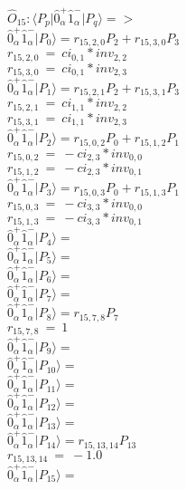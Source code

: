 \documentclass[14pt]{article}
\begin{document}
    $\hat{O}_{15}:  \langle{P_p}\vert \hat{0}_{\alpha}^{+}\hat{1}_{\alpha}^{-} \vert{P_q}\rangle => $ \\ 
    $ \hat{0}_{\alpha}^{+}\hat{1}_{\alpha}^{-} \vert{P_{0}}\rangle = {r}_{15,2,0}P_{2}+{r}_{15,3,0}P_{3} $ \\ 
    ${r}_{15,2,0}\ =\ {ci}_{0,1}*{inv}_{2,2} $ \\ 
    ${r}_{15,3,0}\ =\ {ci}_{0,1}*{inv}_{2,3} $ \\ 
    $ \hat{0}_{\alpha}^{+}\hat{1}_{\alpha}^{-} \vert{P_{1}}\rangle = {r}_{15,2,1}P_{2}+{r}_{15,3,1}P_{3} $ \\ 
    ${r}_{15,2,1}\ =\ {ci}_{1,1}*{inv}_{2,2} $ \\ 
    ${r}_{15,3,1}\ =\ {ci}_{1,1}*{inv}_{2,3} $ \\ 
    $ \hat{0}_{\alpha}^{+}\hat{1}_{\alpha}^{-} \vert{P_{2}}\rangle = {r}_{15,0,2}P_{0}+{r}_{15,1,2}P_{1} $ \\ 
    ${r}_{15,0,2}\ =\ -{ci}_{2,3}*{inv}_{0,0} $ \\ 
    ${r}_{15,1,2}\ =\ -{ci}_{2,3}*{inv}_{0,1} $ \\ 
    $ \hat{0}_{\alpha}^{+}\hat{1}_{\alpha}^{-} \vert{P_{3}}\rangle = {r}_{15,0,3}P_{0}+{r}_{15,1,3}P_{1} $ \\ 
    ${r}_{15,0,3}\ =\ -{ci}_{3,3}*{inv}_{0,0} $ \\ 
    ${r}_{15,1,3}\ =\ -{ci}_{3,3}*{inv}_{0,1} $ \\ 
    $ \hat{0}_{\alpha}^{+}\hat{1}_{\alpha}^{-} \vert{P_{4}}\rangle =  $ \\ 
    $ \hat{0}_{\alpha}^{+}\hat{1}_{\alpha}^{-} \vert{P_{5}}\rangle =  $ \\ 
    $ \hat{0}_{\alpha}^{+}\hat{1}_{\alpha}^{-} \vert{P_{6}}\rangle =  $ \\ 
    $ \hat{0}_{\alpha}^{+}\hat{1}_{\alpha}^{-} \vert{P_{7}}\rangle =  $ \\ 
    $ \hat{0}_{\alpha}^{+}\hat{1}_{\alpha}^{-} \vert{P_{8}}\rangle = {r}_{15,7,8}P_{7} $ \\ 
    ${r}_{15,7,8}\ =\ 1 $ \\ 
    $ \hat{0}_{\alpha}^{+}\hat{1}_{\alpha}^{-} \vert{P_{9}}\rangle =  $ \\ 
    $ \hat{0}_{\alpha}^{+}\hat{1}_{\alpha}^{-} \vert{P_{10}}\rangle =  $ \\ 
    $ \hat{0}_{\alpha}^{+}\hat{1}_{\alpha}^{-} \vert{P_{11}}\rangle =  $ \\ 
    $ \hat{0}_{\alpha}^{+}\hat{1}_{\alpha}^{-} \vert{P_{12}}\rangle =  $ \\ 
    $ \hat{0}_{\alpha}^{+}\hat{1}_{\alpha}^{-} \vert{P_{13}}\rangle =  $ \\ 
    $ \hat{0}_{\alpha}^{+}\hat{1}_{\alpha}^{-} \vert{P_{14}}\rangle = {r}_{15,13,14}P_{13} $ \\ 
    ${r}_{15,13,14}\ =\ -1.0 $ \\ 
    $ \hat{0}_{\alpha}^{+}\hat{1}_{\alpha}^{-} \vert{P_{15}}\rangle =  $ \\ 
    
\end{document}
